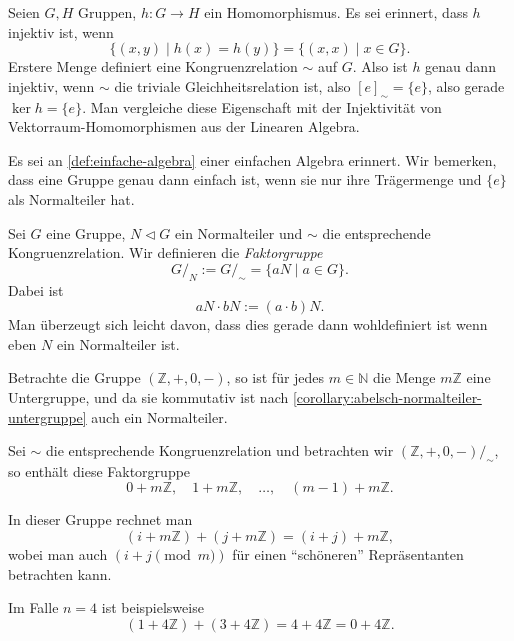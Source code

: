 
\begin{remark} \label{remark:gruppe-injektiv-kern-trivial}
    Seien $G, H$ Gruppen, $h : G \to H$ ein Homomorphismus. Es sei erinnert, dass $h$ injektiv ist, wenn
    $$ \{ (x,y) \mid h(x) = h(y) \} = \{ (x,x) \mid x \in G \}. $$
    Erstere Menge definiert eine Kongruenzrelation $\sim$ auf $G$. Also ist $h$ genau dann injektiv, wenn $\sim$ die triviale Gleichheitsrelation ist, also $[e]_\sim = \{e\}$, also gerade $\ker h = \{ e \}$. Man vergleiche diese Eigenschaft mit der Injektivität von Vektorraum-Homomorphismen aus der Linearen Algebra.
\end{remark}

\begin{remark}
    Es sei an \cref{def:einfache-algebra} einer einfachen Algebra erinnert. Wir bemerken, dass eine Gruppe genau dann einfach ist, wenn sie nur ihre Trägermenge und $\{e\}$ als Normalteiler hat.
\end{remark}

\begin{definition}
    Sei $G$ eine Gruppe, $N \vartriangleleft G$ ein Normalteiler und $\sim$ die entsprechende Kongruenzrelation. Wir definieren die \emph{Faktorgruppe} 
    $$ G /_N := G /_\sim = \{ aN \mid a \in G \}. $$
    Dabei ist
    $$ aN \cdot bN := (a \cdot b)N. $$
    Man überzeugt sich leicht davon, dass dies gerade dann wohldefiniert ist wenn eben $N$ ein Normalteiler ist.
\end{definition}

\begin{example}
    Betrachte die Gruppe $(\mathbb{Z}, +, 0, -)$, so ist für jedes $m \in \mathbb{N}$ die Menge $m \mathbb{Z}$ eine Untergruppe, und da sie kommutativ ist nach \cref{corollary:abelsch-normalteiler-untergruppe} auch ein Normalteiler.

    Sei $\sim$ die entsprechende Kongruenzrelation und betrachten wir $(\mathbb{Z}, +, 0, -)/_\sim$, so enthält diese Faktorgruppe
    $$ 0 + m\mathbb{Z}, \quad 1 + m\mathbb{Z}, \quad \hdots, \quad (m-1) + m\mathbb{Z}. $$

    In dieser Gruppe rechnet man
    $$ (i + m\mathbb{Z}) + (j + m\mathbb{Z}) = (i+j) + m\mathbb{Z}, $$
    wobei man auch $(i + j \pmod{m})$ für einen ``schöneren'' Repräsentanten betrachten kann.

    Im Falle $n = 4$ ist beispielsweise
    $$ (1 + 4\mathbb{Z}) + (3 + 4\mathbb{Z}) = 4 + 4\mathbb{Z} = 0 + 4\mathbb{Z}. $$
\end{example}

